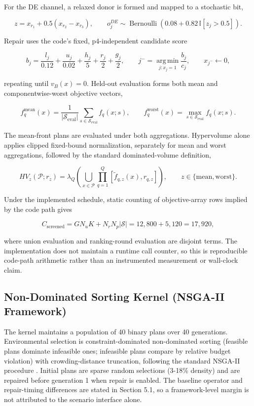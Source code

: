 \documentclass[energies,article,submit,moreauthors]{Definitions/mdpi}
\begin{document}
For the DE channel, a relaxed donor is formed and mapped to a stochastic bit,

\[
z=x_{r_1}+0.5(x_{r_2}-x_{r_3}),\qquad
o_j^{DE}\sim\operatorname{Bernoulli}\!\left(0.08+0.82\,\mathbb I[z_j>0.5]\right).
\]

Repair uses the code's fixed, p4-independent candidate score

\[
b_j=\frac{l_j}{0.12}+\frac{u_j}{0.02}+\frac{h_j}{5}
+\frac{r_j}{2}+\frac{g_j}{2},\qquad
j^-=\operatorname*{arg\,min}_{j:x_j=1}\frac{b_j}{c_j},\qquad x_{j^-}\leftarrow0,
\]

repeating until \(v_B(x)=0\). Held-out evaluation forms both mean and componentwise-worst objective vectors,

\[
f_q^{\mathrm{mean}}(x)=\frac{1}{|\mathcal S_{\mathrm{eval}}|}
\sum_{s\in\mathcal S_{\mathrm{eval}}}f_q(x;s),\qquad
f_q^{\mathrm{worst}}(x)=\max_{s\in\mathcal S_{\mathrm{eval}}}f_q(x;s).
\]

The mean-front plans are evaluated under both aggregations. Hypervolume alone applies clipped fixed-bound normalization, separately for mean and worst aggregations, followed by the standard dominated-volume definition,

\[
HV_z(\mathcal P;r_z)=\lambda_Q\!\left(
\bigcup_{x\in\mathcal P}\prod_{q=1}^{Q}
[\tilde f_{q,z}(x),r_{q,z}]\right),\qquad
z\in\{\mathrm{mean},\mathrm{worst}\}.
\]

Under the implemented schedule, static counting of objective-array rows implied by the code path gives

\[
C_{\mathrm{screened}}=GN_uK+N_rN_p|\mathcal S|=12{,}800+5{,}120=17{,}920,
\]

where union evaluation and ranking-round evaluation are disjoint terms. The implementation does not maintain a runtime call counter, so this is reproducible code-path arithmetic rather than an instrumented measurement or wall-clock claim.

\subsection{Non-Dominated Sorting Kernel (NSGA-II Framework)}\label{non-dominated-sorting-kernel-nsga-ii-framework}

The kernel maintains a population of 40 binary plans over 40 generations. Environmental selection is constraint-dominated non-dominated sorting (feasible plans dominate infeasible ones; infeasible plans compare by relative budget violation) with crowding-distance truncation, following the standard NSGA-II procedure \cite{ref30}. Initial plans are sparse random selections (3-18\% density) and are repaired before generation 1 when repair is enabled. The baseline operator and repair-timing differences are stated in Section 5.1, so a framework-level margin is not attributed to the scenario interface alone.
\end{document}
